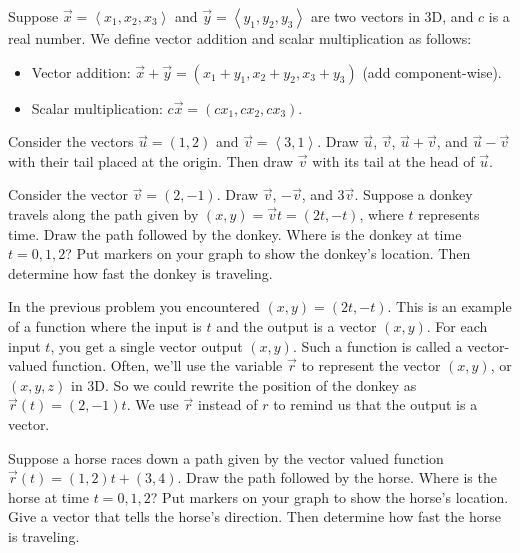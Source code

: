 \begin{definition}
Suppose $\vec x=\left<x_1,x_2,x_3\right>$ and $\vec y=\left<y_1,y_2,y_3\right>$ are two vectors in 3D, and $c$ is a real number. We define vector addition and scalar multiplication as follows:
\begin{itemize}
\item Vector addition: $\vec x+\vec y = (x_1+y_1,x_2+y_2,x_3+y_3)$ (add component-wise).
\item Scalar multiplication: $c\vec x = (cx_1,cx_2,cx_3)$.
\end{itemize}
\end{definition}


\begin{problem}
Consider the vectors $\vec u=(1,2)$ and $\vec v=\left<3,1\right>$.  Draw $\vec u$, $\vec v$, $\vec u+\vec v$, and $\vec u-\vec v$ with their tail placed at the origin.  Then draw $\vec v$ with its tail at the head of $\vec u$. 
\end{problem}

\begin{problem}
Consider the vector $\vec v=(2,-1)$.  Draw $\vec v$, $-\vec v$, and $3\vec v$. 
Suppose a donkey travels along the path given by $(x,y)=\vec v t = (2t,-t)$, where $t$ represents time. Draw the path followed by the donkey. Where is the donkey at time $t=0,1,2$? Put markers on your graph to show the donkey's location. Then determine how fast the donkey is traveling.
\end{problem}

In the previous problem you encountered $(x,y)=(2t,-t)$.  This is an example of a function where the input is $t$ and the output is a vector $(x,y)$.  For each input $t$, you get a single vector output $(x,y)$. Such a function is called a vector-valued function. Often, we'll use the variable $\vec r$ to represent the vector $(x,y)$, or $(x,y,z)$ in 3D.  So we could rewrite the position of the donkey as $\vec r(t)=(2,-1)t$. We use $\vec r$ instead of $r$ to remind us that the output is a vector.

\begin{problem}\label{horse line}
Suppose a horse races down a path given by the vector valued function $\vec r(t) = (1,2)t+(3,4)$.  
Draw the path followed by the horse. Where is the horse at time $t=0,1,2$? Put markers on your graph to show the horse's location. Give a vector that tells the horse's direction. Then determine how fast the horse is traveling.
\end{problem}

